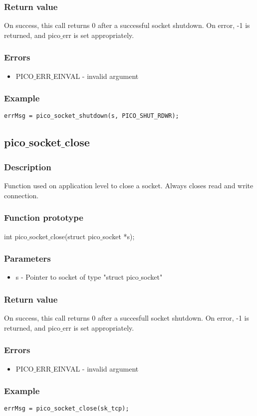 \subsubsection*{Return value}
On success, this call returns 0 after a successful socket shutdown.
On error, -1 is returned, and pico$\_$err is set appropriately.

\subsubsection*{Errors}
\begin{itemize}
\item PICO$\_$ERR$\_$EINVAL - invalid argument
\end{itemize}

\subsubsection*{Example}
\begin{verbatim}
errMsg = pico_socket_shutdown(s, PICO_SHUT_RDWR);
\end{verbatim}


\subsection{pico$\_$socket$\_$close}

\subsubsection*{Description}
Function used on application level to close a socket. Always closes read and write connection.

\subsubsection*{Function prototype}
int pico$\_$socket$\_$close(struct pico$\_$socket *s);

\subsubsection*{Parameters}
\begin{itemize}
\item s - Pointer to socket of type "struct pico$\_$socket"
\end{itemize}

\subsubsection*{Return value}
On success, this call returns 0 after a succesfull socket shutdown.
On error, -1 is returned, and pico$\_$err is set appropriately.

\subsubsection*{Errors}
\begin{itemize}
\item PICO$\_$ERR$\_$EINVAL - invalid argument
\end{itemize}

\subsubsection*{Example}
\begin{verbatim}
errMsg = pico_socket_close(sk_tcp);
\end{verbatim}
